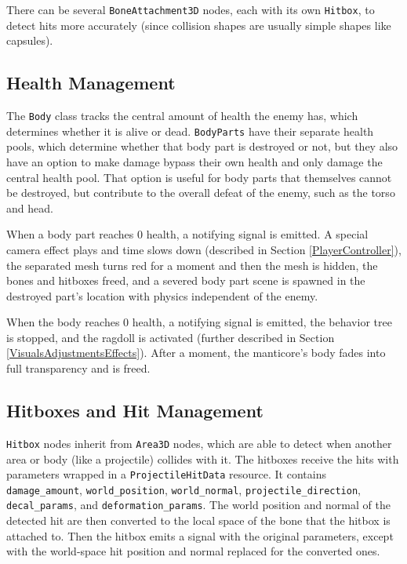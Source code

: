 There can be several \texttt{BoneAttachment3D} nodes, each with its own \texttt{Hitbox}, to detect hits more accurately (since collision shapes are usually simple shapes like capsules).

\subsection{Health Management}
The \texttt{Body} class tracks the central amount of health the enemy has, which determines whether it is alive or dead. \texttt{BodyParts} have their separate health pools, which determine whether that body part is destroyed or not, but they also have an option to make damage bypass their own health and only damage the central health pool. That option is useful for body parts that themselves cannot be destroyed, but contribute to the overall defeat of the enemy, such as the torso and head.

When a body part reaches 0 health, a notifying signal is emitted. A special camera effect plays and time slows down (described in Section \ref{PlayerController}), the separated mesh turns red for a moment and then the mesh is hidden, the bones and hitboxes freed, and a severed body part scene is spawned in the destroyed part's location with physics independent of the enemy.

When the body reaches 0 health, a notifying signal is emitted, the behavior tree is stopped, and the ragdoll is activated (further described in Section \ref{VisualsAdjustmentsEffects}). After a moment, the manticore's body fades into full transparency and is freed.

\subsection{Hitboxes and Hit Management}
\texttt{Hitbox} nodes inherit from \texttt{Area3D} nodes, which are able to detect when another area or body (like a projectile) collides with it. The hitboxes receive the hits with parameters wrapped in a \texttt{ProjectileHitData} resource. It contains \texttt{damage\_amount}, \texttt{world\_position}, \texttt{world\_normal}, \texttt{projectile\_direction}, \texttt{decal\_params}, and \texttt{deformation\_params}. The world position and normal of the detected hit are then converted to the local space of the bone that the hitbox is attached to. Then the hitbox emits a signal with the original parameters, except with the world-space hit position and normal replaced for the converted ones.

